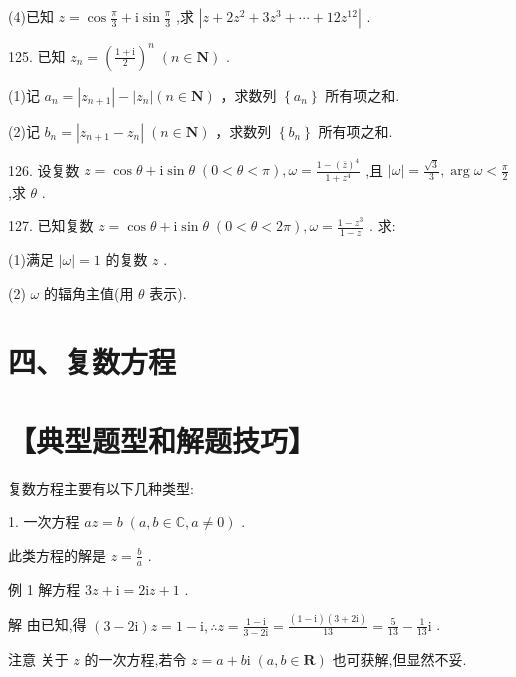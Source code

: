 \documentclass[10pt]{article}
\begin{document}
(4)已知 \(z = \cos \frac{\pi }{3} + \mathrm{i}\sin \frac{\pi }{3}\) ,求 \(\left| {z + 2{z}^{2} + 3{z}^{3} + \cdots  + {12}{z}^{12}}\right|\) .

125. 已知 \({z}_{n} = {\left( \frac{1 + \mathrm{i}}{2}\right) }^{n}\;\left( {n \in  \mathbf{N}}\right)\) .

(1)记 \({a}_{n} = \left| {z}_{n + 1}\right|  - \left| {z}_{n}\right| \left( {n \in  \mathbf{N}}\right)\) ，求数列 \(\left\{  {a}_{n}\right\}\) 所有项之和.

(2)记 \({b}_{n} = \left| {{z}_{n + 1} - {z}_{n}}\right| \;\left( {n \in  \mathbf{N}}\right)\) ，求数列 \(\left\{  {b}_{n}\right\}\) 所有项之和.

126. 设复数 \(z = \cos \theta  + \mathrm{i}\sin \theta \;\left( {0 < \theta  < \pi }\right) ,\omega  = \frac{1 - {\left( \bar{z}\right) }^{4}}{1 + {z}^{4}}\) ,且 \(\left| \omega \right|  = \frac{\sqrt{3}}{3},\arg \omega  < \frac{\pi }{2}\) ,求 \(\theta\) .

127. 已知复数 \(z = \cos \theta  + \mathrm{i}\sin \theta \;\left( {0 < \theta  < {2\pi }}\right) ,\omega  = \frac{1 - {z}^{3}}{1 - z}\) . 求:

(1)满足 \(\left| \omega \right|  = 1\) 的复数 \(z\) .

(2) \(\omega\) 的辐角主值(用 \(\theta\) 表示).

\section*{四、复数方程}

\section*{【典型题型和解题技巧】}

复数方程主要有以下几种类型:

1. 一次方程 \({az} = b\;\left( {a,b \in  \mathbb{C},a \neq  0}\right)\) .

此类方程的解是 \(z = \frac{b}{a}\) .

例 1 解方程 \({3z} + \mathrm{i} = 2\mathrm{i}z + 1\) .

解 由已知,得 \(\left( {3 - 2\mathrm{i}}\right) z = 1 - \mathrm{i},\therefore z = \frac{1 - \mathrm{i}}{3 - 2\mathrm{i}} = \frac{\left( {1 - \mathrm{i}}\right) \left( {3 + 2\mathrm{i}}\right) }{13} = \frac{5}{13} - \frac{1}{13}\mathrm{i}\) .

注意 关于 \(z\) 的一次方程,若令 \(z = a + b\mathrm{i}\;\left( {a,b \in  \mathbf{R}}\right)\) 也可获解,但显然不妥.
\end{document}
